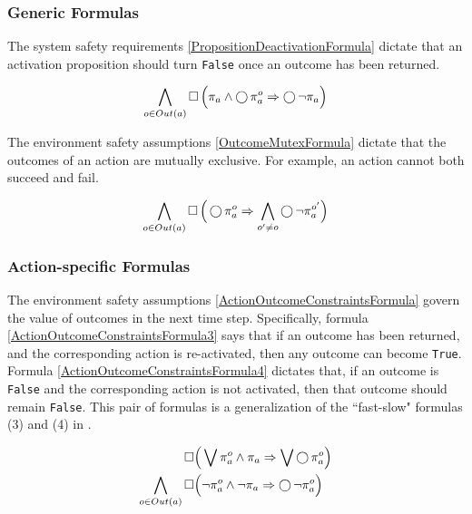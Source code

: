\subsubsection{Generic Formulas}

The system safety requirements \eqref{PropositionDeactivationFormula} dictate that an activation proposition should turn \texttt{False} once an outcome has been returned.

\begin{equation}\label{PropositionDeactivationFormula}
	\bigwedge \limits_{o \in Out(a)} \operatorname{\Box} \Big( \pi_a \wedge \operatorname{\bigcirc} \pi_a^o \Rightarrow \operatorname{\bigcirc} \lnot \pi_a \Big)
\end{equation}

The environment safety assumptions \eqref{OutcomeMutexFormula} dictate that the outcomes of an action are mutually exclusive. 
For example, an action cannot both succeed and fail.

\begin{equation}\label{OutcomeMutexFormula}
	\bigwedge \limits_{o \in Out(a)} \operatorname{\Box} \Big( \operatorname{\bigcirc} \pi_a^o \Rightarrow \bigwedge \limits_{o^\prime \neq o} \operatorname{\bigcirc} \lnot \pi_a^{o^\prime} \Big)
\end{equation}


\subsubsection{Action-specific Formulas}

The environment safety assumptions \eqref{ActionOutcomeConstraintsFormula} govern the value of outcomes in the next time step. 
Specifically, formula \eqref{ActionOutcomeConstraintsFormula3} says that if an outcome has been returned, and the corresponding action is re-activated, then any outcome can become \texttt{True}. 
Formula \eqref{ActionOutcomeConstraintsFormula4} dictates that, if an outcome is \texttt{False} and the corresponding action is not activated, then that outcome should remain \texttt{False}.
This pair of formulas is a generalization of the ``fast-slow" formulas (3) and (4) in \cite{Vasu2013ICRA}.

\begin{subequations}
	\label{ActionOutcomeConstraintsFormula}
	\begin{align}
		\operatorname{\Box}& \Big( \bigvee \pi_a^o \wedge \pi_a \Rightarrow \bigvee \operatorname{\bigcirc} \pi_a^o \Big)\label{ActionOutcomeConstraintsFormula3}\\
		\bigwedge \limits_{o \in Out(a)} \operatorname{\Box}& \Big( \lnot \pi_a^o \wedge \lnot \pi_a \Rightarrow \operatorname{\bigcirc} \lnot \pi_a^o \Big)\label{ActionOutcomeConstraintsFormula4}
	\end{align}
\end{subequations}


